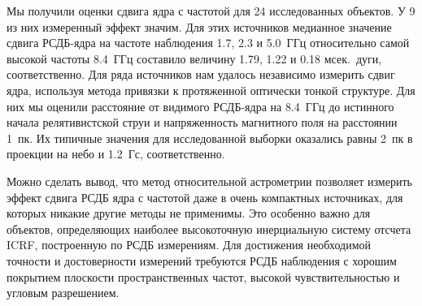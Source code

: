 Мы получили оценки сдвига ядра с частотой для 24 исследованных объектов. У 9 из них измеренный
эффект значим. Для этих источников медианное значение сдвига РСДБ-ядра на частоте наблюдения 1.7,
2.3 и 5.0~ГГц относительно самой высокой частоты 8.4~ГГц составило величину 1.79, 1.22 и 0.18
мсек.~дуги, соответственно.
%
Для ряда источников нам удалось независимо измерить сдвиг ядра, используя метода привязки к
протяженной оптически тонкой структуре. Для них мы оценили расстояние от видимого РСДБ-ядра на
8.4~ГГц до истинного начала релятивистской струи и напряженность магнитного поля на расстоянии 1~пк.
Их типичные значения для исследованной выборки оказались равны 2~пк в проекции на небо и 1.2~Гс,
соответственно.

Можно сделать вывод, что метод относительной астрометрии позволяет измерить эффект сдвига РСДБ ядра
с частотой даже в очень компактных источниках, для которых никакие другие методы не применимы. Это
особенно важно для объектов, определяющих наиболее высокоточную инерциальную систему отсчета ICRF,
построенную по РСДБ измерениям. Для достижения необходимой точности и достоверности измерений
требуются РСДБ наблюдения с хорошим покрытием плоскости пространственных частот, высокой
чувствительностью и угловым разрешением.
